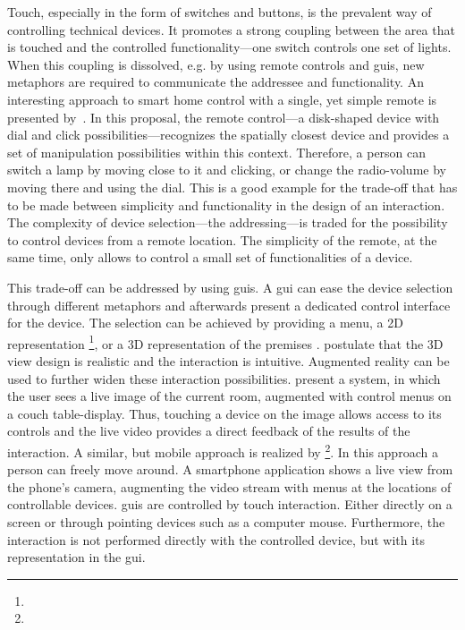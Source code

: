 Touch, especially in the form of switches and buttons, is the prevalent way of controlling technical \glspl{device}.
It promotes a strong coupling between the area that is touched and the controlled functionality---one switch controls one set of lights.
When this coupling is dissolved, e.g. by using remote controls and \glspl{gui}, new metaphors are required to communicate the \gls{addressee} and functionality.
An interesting approach to \gls{smart home} control with a single, yet simple remote is presented by~.
In this proposal, the remote control---a disk-shaped \gls{device} with dial and click possibilities---recognizes the spatially closest \gls{device} and provides a set of manipulation possibilities within this context.
Therefore, a person can switch a lamp by moving close to it and clicking, or change the radio-volume by moving there and using the dial.
This is a good example for the trade-off that has to be made between simplicity and functionality in the design of an interaction.
The complexity of \gls{device} selection---the addressing---is traded for the possibility to control \glspl{device} from a remote location.
The simplicity of the remote, at the same time, only allows to control a small set of functionalities of a \gls{device}.

This trade-off can be addressed by using \glspl{gui}.
A \gls{gui} can ease the \gls{device} selection through different metaphors and afterwards present a dedicated control interface for the \gls{device}.
The selection can be achieved by providing a menu, a 2D representation \cite{Pohling2018}\footnote{}, or a 3D representation of the premises \cite[]{Borodulkin2002}.
\citeauthor*{Borodulkin2002} postulate that the 3D view design is realistic and the interaction is intuitive.
Augmented reality can be used to further widen these interaction possibilities.
 present a system, in which the user sees a live image of the current room, augmented with control menus on a couch table-display.
Thus, touching a \gls{device} on the image allows access to its controls and the live video provides a direct feedback of the results of the interaction.
A similar, but mobile approach is realized by \footnote{}.
In this approach a person can freely move around.
A smartphone application shows a live view from the phone's camera, augmenting the video stream with menus at the locations of controllable \glspl{device}.
\Glspl{gui} are controlled by touch interaction.
Either directly on a screen or through pointing \glspl{device} such as a computer mouse.
Furthermore, the interaction is not performed directly with the controlled \gls{device}, but with its representation in the \gls{gui}.


